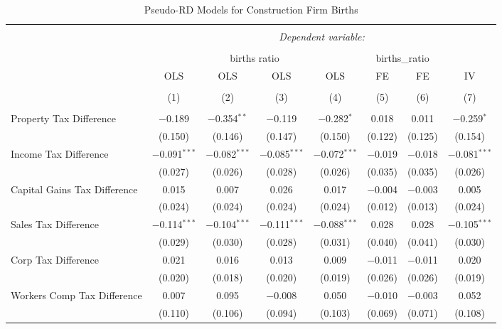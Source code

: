 
\begin{table}[!htbp] \centering 
  \caption{Pseudo-RD Models for  Construction Firm Births} 
  \label{} 
\begin{tabular}{@{\extracolsep{5pt}}lccccccc} 
\\[-1.8ex]\hline 
\hline \\[-1.8ex] 
 & \multicolumn{7}{c}{\textit{Dependent variable:}} \\ 
\cline{2-8} 
\\[-1.8ex] & \multicolumn{4}{c}{births ratio} & \multicolumn{2}{c}{births\_ratio} &   \\ 
 & OLS & OLS & OLS & OLS & FE & FE & IV \\ 
\\[-1.8ex] & (1) & (2) & (3) & (4) & (5) & (6) & (7)\\ 
\hline \\[-1.8ex] 
 Property Tax Difference & $-$0.189 & $-$0.354$^{**}$ & $-$0.119 & $-$0.282$^{*}$ & 0.018 & 0.011 & $-$0.259$^{*}$ \\ 
  & (0.150) & (0.146) & (0.147) & (0.150) & (0.122) & (0.125) & (0.154) \\ 
  Income Tax Difference & $-$0.091$^{***}$ & $-$0.082$^{***}$ & $-$0.085$^{***}$ & $-$0.072$^{***}$ & $-$0.019 & $-$0.018 & $-$0.081$^{***}$ \\ 
  & (0.027) & (0.026) & (0.028) & (0.026) & (0.035) & (0.035) & (0.026) \\ 
  Capital Gains Tax Difference & 0.015 & 0.007 & 0.026 & 0.017 & $-$0.004 & $-$0.003 & 0.005 \\ 
  & (0.024) & (0.024) & (0.024) & (0.024) & (0.012) & (0.013) & (0.024) \\ 
  Sales Tax Difference & $-$0.114$^{***}$ & $-$0.104$^{***}$ & $-$0.111$^{***}$ & $-$0.088$^{***}$ & 0.028 & 0.028 & $-$0.105$^{***}$ \\ 
  & (0.029) & (0.030) & (0.028) & (0.031) & (0.040) & (0.041) & (0.030) \\ 
  Corp Tax Difference & 0.021 & 0.016 & 0.013 & 0.009 & $-$0.011 & $-$0.011 & 0.020 \\ 
  & (0.020) & (0.018) & (0.020) & (0.019) & (0.026) & (0.026) & (0.019) \\ 
  Workers Comp Tax Difference & 0.007 & 0.095 & $-$0.008 & 0.050 & $-$0.010 & $-$0.003 & 0.052 \\ 
  & (0.110) & (0.106) & (0.094) & (0.103) & (0.069) & (0.071) & (0.108) \\ 

\end{tabular}
\end{table}
